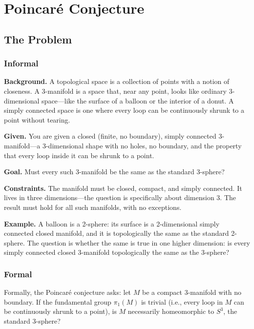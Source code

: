 \let\LocalMacro\relax

\chapter{Poincar\'e Conjecture}

\section{The Problem}

\subsection{Informal}

\textbf{Background.} A topological space is a collection of points with a notion of closeness. A 3-manifold is a space that, near any point, looks like ordinary 3-dimensional space---like the surface of a balloon or the interior of a donut. A simply connected space is one where every loop can be continuously shrunk to a point without tearing.

\textbf{Given.} You are given a closed (finite, no boundary), simply connected 3-manifold---a 3-dimensional shape with no holes, no boundary, and the property that every loop inside it can be shrunk to a point.

\textbf{Goal.} Must every such 3-manifold be the same as the standard 3-sphere?

\textbf{Constraints.} The manifold must be closed, compact, and simply connected. It lives in three dimensions---the question is specifically about dimension 3. The result must hold for all such manifolds, with no exceptions.

\textbf{Example.} A balloon is a 2-sphere: its surface is a 2-dimensional simply connected closed manifold, and it is topologically the same as the standard 2-sphere. The question is whether the same is true in one higher dimension: is every simply connected closed 3-manifold topologically the same as the 3-sphere?

\subsection{Formal}
Formally, the Poincar\'e conjecture asks: let $M$ be a compact 3-manifold with no boundary. If the fundamental group $\pi_1(M)$ is trivial (i.e., every loop in $M$ can be continuously shrunk to a point), is $M$ necessarily homeomorphic to $S^3$, the standard 3-sphere?


